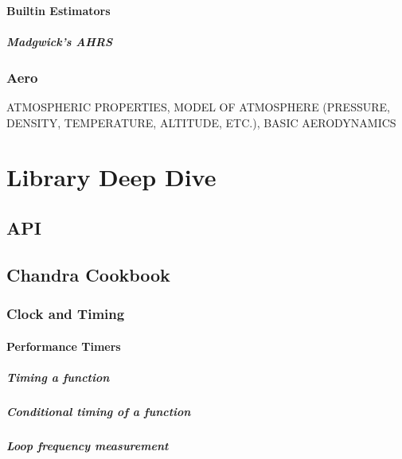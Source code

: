 \documentclass[12pt,letterpaper,article]{memoir} %
\begin{document}
\subsection{Builtin Estimators}
\subsubsection{Madgwick's AHRS}

\section{Aero}
ATMOSPHERIC PROPERTIES, MODEL OF ATMOSPHERE (PRESSURE, DENSITY, TEMPERATURE, ALTITUDE, ETC.), BASIC AERODYNAMICS

\part{Library Deep Dive}
\chapter{API}

\section{}
\subsection{}

\chapter{Chandra Cookbook}
\section{Clock and Timing}
\subsection{Performance Timers}
\subsubsection{Timing a function}
\subsubsection{Conditional timing of a function}
\subsubsection{Loop frequency measurement}
\end{document}
